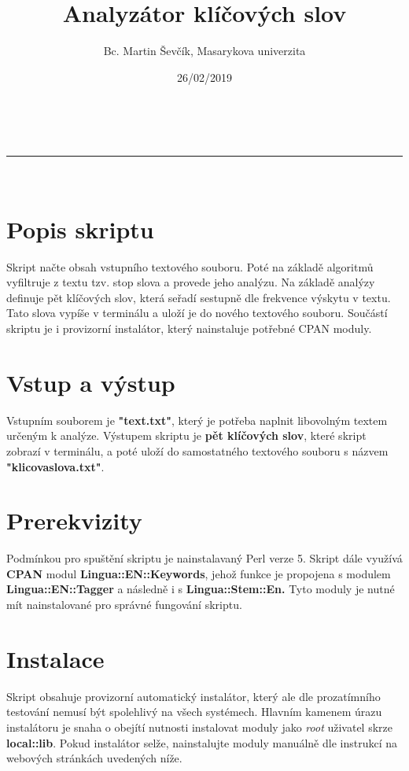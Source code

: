 \documentclass[a4paper,11pt]{article}
\makeatletter
\newcommand{\linia}{\rule{\linewidth}{0.5pt}}
\theoremstyle{mytheor}
\renewcommand{\maketitle}{
\begin{center}
\vspace{2ex}
{\huge \textsc{\@title}}
\vspace{1ex}
\\
\linia\\
\@author \hfill \@date
\vspace{4ex}
\end{center}
}
\makeatother
\begin{document}
\title{Analyzátor klíčových slov}

\author{Bc. Martin Ševčík, Masarykova univerzita}

\date{26/02/2019}

\maketitle

\section*{Popis skriptu}

Skript načte obsah vstupního textového souboru. Poté na základě algoritmů
vyfiltruje z textu tzv. stop slova a provede jeho analýzu. Na základě
analýzy definuje pět klíčových slov, která seřadí sestupně dle frekvence
výskytu v textu. Tato slova vypíše v terminálu a uloží je do nového
textového souboru. Součástí skriptu je i provizorní instalátor, který
nainstaluje potřebné CPAN moduly.

\section*{Vstup a výstup}

Vstupním souborem je \textbf{"text.txt"}, který je potřeba naplnit
libovolným textem určeným k analýze. Výstupem skriptu je \textbf{pět
klíčových slov}, které skript
zobrazí v terminálu, a poté uloží do samostatného textového souboru s názvem
\textbf{"klicovaslova.txt"}.

\section*{Prerekvizity}

Podmínkou pro spuštění skriptu je nainstalavaný Perl verze 5. Skript dále
využívá \textbf{CPAN} modul \textbf{Lingua::EN::Keywords}, jehož funkce je
propojena s modulem
\textbf{Lingua::EN::Tagger} a následně i s \textbf{Lingua::Stem::En.} Tyto
moduly je nutné mít
nainstalované pro správné fungování skriptu.

\section*{Instalace}

Skript obsahuje provizorní automatický instalátor, který ale dle
prozatímního testování nemusí být spolehlivý na všech systémech. Hlavním
kamenem úrazu instalátoru je snaha o obejítí nutnosti instalovat moduly jako
\textit{root} uživatel skrze \textbf{local::lib}. Pokud instalátor selže,
nainstalujte moduly manuálně dle instrukcí na webových stránkách uvedených
níže.
\end{document}
